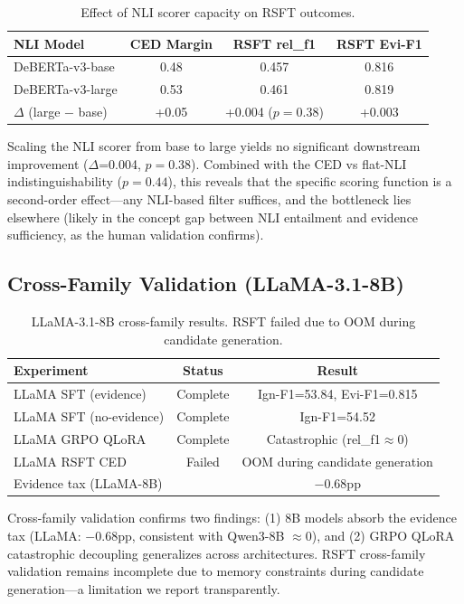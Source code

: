 \documentclass[11pt]{article}
\begin{document}
\begin{table}[h]
\centering
\caption{Effect of NLI scorer capacity on RSFT outcomes.}
\label{tab:nli_ablation}
\begin{tabular}{lccc}
\toprule
\textbf{NLI Model} & \textbf{CED Margin} & \textbf{RSFT rel\_f1} & \textbf{RSFT Evi-F1} \\
\midrule
DeBERTa-v3-base & 0.48 & 0.457 & 0.816 \\
DeBERTa-v3-large & 0.53 & 0.461 & 0.819 \\
$\Delta$ (large $-$ base) & +0.05 & +0.004 ($p=0.38$) & +0.003 \\
\bottomrule
\end{tabular}
\end{table}

Scaling the NLI scorer from base to large yields no significant downstream improvement ($\Delta$=0.004, $p=0.38$). Combined with the CED vs flat-NLI indistinguishability ($p=0.44$), this reveals that the specific scoring function is a second-order effect---any NLI-based filter suffices, and the bottleneck lies elsewhere (likely in the concept gap between NLI entailment and evidence sufficiency, as the human validation confirms).

\subsection{Cross-Family Validation (LLaMA-3.1-8B)}

\begin{table}[h]
\centering
\caption{LLaMA-3.1-8B cross-family results. RSFT failed due to OOM during candidate generation.}
\label{tab:llama}
\begin{tabular}{lcc}
\toprule
\textbf{Experiment} & \textbf{Status} & \textbf{Result} \\
\midrule
LLaMA SFT (evidence) & Complete & Ign-F1=53.84, Evi-F1=0.815 \\
LLaMA SFT (no-evidence) & Complete & Ign-F1=54.52 \\
LLaMA GRPO QLoRA & Complete & Catastrophic (rel\_f1$\approx$0) \\
LLaMA RSFT CED & Failed & OOM during candidate generation \\
\midrule
\multicolumn{2}{l}{Evidence tax (LLaMA-8B)} & $-0.68$pp \\
\bottomrule
\end{tabular}
\end{table}

Cross-family validation confirms two findings: (1) 8B models absorb the evidence tax (LLaMA: $-0.68$pp, consistent with Qwen3-8B $\approx 0$), and (2) GRPO QLoRA catastrophic decoupling generalizes across architectures. RSFT cross-family validation remains incomplete due to memory constraints during candidate generation---a limitation we report transparently.
\end{document}
